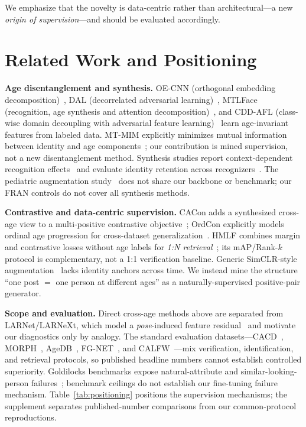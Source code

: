 \documentclass[journal]{IEEEtran}
\begin{document}
We emphasize that the novelty is data-centric rather than architectural---a new \emph{origin of supervision}---and should be evaluated accordingly.

\section{Related Work and Positioning}\label{sec:related}
\noindent\textbf{Age disentanglement and synthesis.}
OE-CNN (orthogonal embedding decomposition)~\cite{wang2018oecnn}, DAL (decorrelated adversarial
learning)~\cite{wang2019dal}, MTLFace (recognition, age synthesis and attention decomposition)~\cite{huang2021mtlface},
and CDD-AFL (class-wise domain decoupling with adversarial feature learning)~\cite{wu2024cddafl}
learn age-invariant features from labeled data. MT-MIM explicitly minimizes mutual information
between identity and age components~\cite{hou2021mtmim}; our contribution is mined supervision,
not a new disentanglement method. Synthesis studies report context-dependent recognition
effects~\cite{yao2024synthageing,hossain2026longitudinal} and evaluate identity retention across
recognizers~\cite{luevano2025identity}. The pediatric augmentation study~\cite{hossain2026longitudinal}
does not share our backbone or benchmark; our FRAN controls do not cover all synthesis methods.

\noindent\textbf{Contrastive and data-centric supervision.}
CACon adds a synthesized cross-age view to a multi-positive contrastive objective~\cite{wang2024cacon};
OrdCon explicitly models ordinal age progression for cross-dataset generalization~\cite{wang2025ordcon}.
HMLF combines margin and contrastive losses without age labels for \emph{1:N retrieval}~\cite{cao2026hmlf};
its mAP/Rank-$k$ protocol is complementary, not a 1:1 verification baseline. Generic SimCLR-style
augmentation~\cite{chen2020simclr} lacks identity anchors across time. We instead mine the structure
``one post $=$ one person at different ages'' as a naturally-supervised positive-pair generator.

\noindent\textbf{Scope and evaluation.}
Direct cross-age methods above are separated from LARNet/LARNeXt, which model a \emph{pose}-induced
feature residual~\cite{yang2021larnet,yang2023larnext} and motivate our diagnostics only by analogy.
The standard evaluation datasets---CACD~\cite{chen2014cacd}, MORPH~\cite{ricanek2006morph},
AgeDB~\cite{moschoglou2017agedb}, FG-NET~\cite{panis2016fgnet}, and CALFW~\cite{zheng2017calfw}---mix
verification, identification, and retrieval protocols, so published headline numbers cannot establish
controlled superiority. Goldilocks benchmarks expose natural-attribute and similar-looking-person
failures~\cite{wu2026goldilocks}; benchmark ceilings do not establish our fine-tuning failure mechanism.
Table~\ref{tab:positioning} positions the supervision mechanisms; the supplement
separates published-number comparisons from our common-protocol reproductions.
\end{document}
